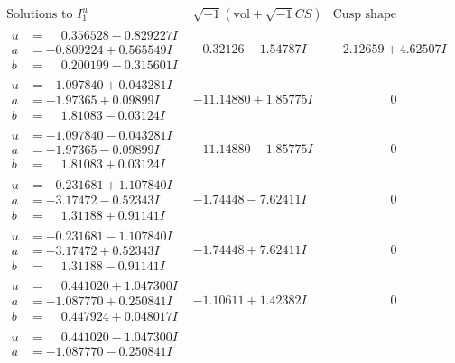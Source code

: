 \documentclass[1p]{elsarticle_modified}
\theoremstyle{definition}
\newcommand{\I}{\sqrt{-1}}
\begin{document}
$$\begin{array}{c|c|c}
\text{Solutions to }I^u_{1}& \I (\text{vol} + \sqrt{-1}CS) & \text{Cusp shape}\\
 \hline 
\begin{aligned}
u &= \phantom{-}0.356528 - 0.829227 I \\
a &= -0.809224 + 0.565549 I \\
b &= \phantom{-}0.200199 - 0.315601 I\end{aligned}
 & -0.32126 - 1.54787 I & -2.12659 + 4.62507 I \\ \hline\begin{aligned}
u &= -1.097840 + 0.043281 I \\
a &= -1.97365 + 0.09899 I \\
b &= \phantom{-}1.81083 - 0.03124 I\end{aligned}
 & -11.14880 + 1.85775 I & \phantom{-0.000000 } 0 \\ \hline\begin{aligned}
u &= -1.097840 - 0.043281 I \\
a &= -1.97365 - 0.09899 I \\
b &= \phantom{-}1.81083 + 0.03124 I\end{aligned}
 & -11.14880 - 1.85775 I & \phantom{-0.000000 } 0 \\ \hline\begin{aligned}
u &= -0.231681 + 1.107840 I \\
a &= -3.17472 - 0.52343 I \\
b &= \phantom{-}1.31188 + 0.91141 I\end{aligned}
 & -1.74448 - 7.62411 I & \phantom{-0.000000 } 0 \\ \hline\begin{aligned}
u &= -0.231681 - 1.107840 I \\
a &= -3.17472 + 0.52343 I \\
b &= \phantom{-}1.31188 - 0.91141 I\end{aligned}
 & -1.74448 + 7.62411 I & \phantom{-0.000000 } 0 \\ \hline\begin{aligned}
u &= \phantom{-}0.441020 + 1.047300 I \\
a &= -1.087770 + 0.250841 I \\
b &= \phantom{-}0.447924 + 0.048017 I\end{aligned}
 & -1.10611 + 1.42382 I & \phantom{-0.000000 } 0 \\ \hline\begin{aligned}
u &= \phantom{-}0.441020 - 1.047300 I \\
a &= -1.087770 - 0.250841 I \\

\end{aligned}
\end{array}$$
\end{document}
